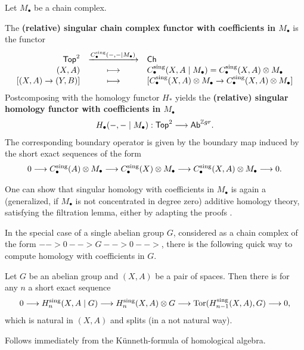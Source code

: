 	\begin{definition}
		Let $M_\bullet$ be a chain complex.

		The \textbf{(relative) singular chain complex functor with coefficients in $M_\bullet$} is the functor
		\begin{equation*}
			\begin{array}{rcl}
				\textsf{Top}^2 & \xrightarrow{C_\bullet^\text{sing}(-,- \mid M_\bullet)} & \textsf{Ch}\\
				(X,A) & \longmapsto & C_\bullet^\text{sing}(X,A \mid M_\bullet) = C_\bullet^\text{sing}(X,A) \otimes M_\bullet\\
				{[(X,A)\rightarrow(Y,B)]} & \longmapsto & {[C_\bullet^\text{sing}(X,A) \otimes M_\bullet \rightarrow C_\bullet^\text{sing}(X,A) \otimes M_\bullet]}
			\end{array}
		\end{equation*}
		Postcomposing with the homology functor $H_{*}$ yields the \textbf{(relative) singular homology functor with coefficients in $M_\bullet$}
		\begin{align*}
			H_\bullet(-,- \mid M_\bullet): \textsf{Top}^2 --> \textsf{Ab}^{\mathbb{Z} gr}.
		\end{align*}
		The corresponding boundary operator is given by the boundary map induced by the short exact sequences of the form
		\begin{align*}
			0 --> C_\bullet^\text{sing}(A) \otimes M_\bullet --> C_\bullet^\text{sing}(X) \otimes M_\bullet --> C_\bullet^\text{sing}(X,A) \otimes M_\bullet --> 0.
		\end{align*}
	\end{definition}

	One can show that singular homology with coefficients in $M_\bullet$ is again a (generalized, if $M_\bullet$ is not concentrated in degree zero) additive homology theory, satisfying the filtration lemma, either by adapting the proofs .

	In the special case of a single abelian group $G$, considered as a chain complex of the form $-->0-->G-->0-->$, there is the following quick way to compute homology with coefficients in $G$.

	\begin{theorem}
		Let $G$ be an abelian group and $(X,A)$ be a pair of spaces. Then there is for any $n$ a short exact sequence
		\begin{align*}
			0 --> H_n^\text{sing}(X,A \mid G) --> H_n^\text{sing}(X,A) \otimes G --> \operatorname{Tor}(H_{n-1}^\text{sing}(X,A),G)-->0,
		\end{align*}
		which is natural in $(X,A)$ and splits (in a not natural way).
	\end{theorem}
	\begin{sketch}
		Follows immediately from the Künneth-formula of homological algebra.
	\end{sketch}
